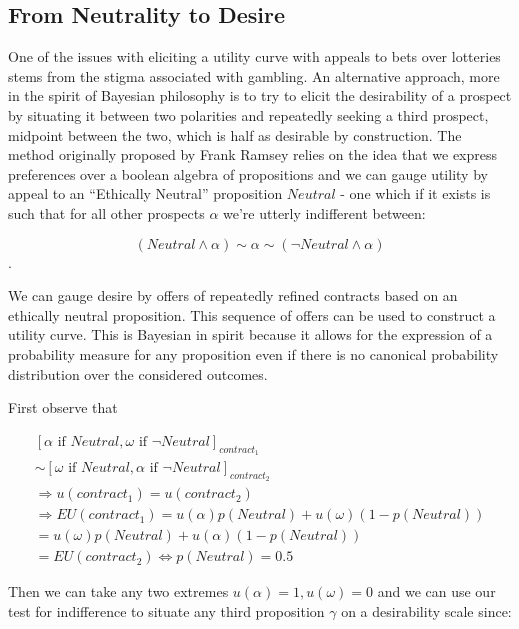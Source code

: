 \documentclass[]{tufte-book}
\theoremstyle{definition}
\theoremstyle{definition}
\theoremstyle{definition}
\theoremstyle{remark}
\begin{document}
\hypertarget{from-neutrality-to-desire}{%
\subsection{From Neutrality to Desire}\label{from-neutrality-to-desire}}

One of the issues with eliciting a utility curve with appeals to bets over lotteries stems from the stigma associated with gambling. An alternative approach, more in the spirit of Bayesian philosophy is to try to elicit the desirability of a prospect by situating it between two polarities and repeatedly seeking a third prospect, midpoint between the two, which is half as desirable by construction. The method originally proposed by Frank Ramsey relies on the idea that we express preferences over a boolean algebra of propositions and we can gauge utility by appeal to an ``Ethically Neutral'' proposition \(Neutral\) - one which if it exists is such that for all other prospects \(\alpha\) we're utterly indifferent between:

\[(Neutral \wedge \alpha) \sim \alpha \sim (\neg Neutral \wedge \alpha)\].

We can gauge desire by offers of repeatedly refined contracts based on an ethically neutral proposition. This sequence of offers can be used to construct a utility curve. This is Bayesian in spirit because it allows for the expression of a probability measure for any proposition even if there is no canonical probability distribution over the considered outcomes.

\noindent First observe that

\begin{equation}
\begin{split}
[ \alpha \text{ if } Neutral, \omega \text{ if } \neg Neutral ]_{contract_{1}} \\  \sim [ \omega  \text{ if } Neutral, \alpha \text{ if } \neg Neutral ]_{contract_{2}} \\   \Rightarrow u(contract_{1})  = u(contract_{2})   \\  \Rightarrow EU(contract_{1}) = u(\alpha)p(Neutral) + u(\omega)(1-p(Neutral)) \\ 
= u(\omega)p(Neutral) + u(\alpha)(1-p(Neutral)) \\ 
= EU(contract_{2}) \Leftrightarrow p(Neutral) = 0.5
\end{split}
\end{equation}

\noindent Then we can take any two extremes \(u(\alpha) = 1, u(\omega) = 0\) and we can use our test for indifference to situate any third proposition \(\gamma\) on a desirability scale since:
\end{document}
